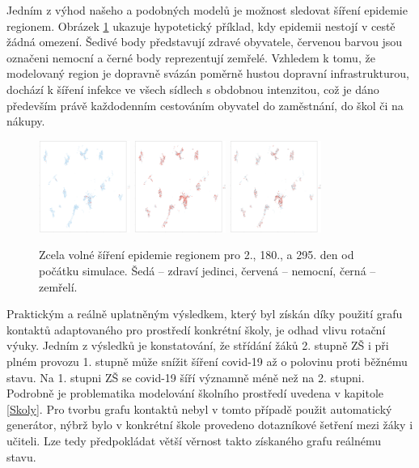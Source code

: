 Jedním z výhod našeho a podobných modelů je možnost sledovat šíření epidemie regionem. Obrázek \ref{sireniepidemie} ukazuje hypotetický příklad, kdy epidemii nestojí v cestě žádná omezení. Šedivé body představují zdravé obyvatele, červenou barvou jsou označeni nemocní a černé body reprezentují zemřelé. Vzhledem k tomu, že modelovaný region je dopravně svázán poměrně hustou dopravní infrastrukturou, dochází k šíření infekce ve všech sídlech s obdobnou intenzitou, což je dáno především právě každodenním cestováním obyvatel do zaměstnání, do škol či na nákupy.

\begin{figure}
\begin{center}
\includegraphics[width=30mm]{pic/hodo002.png}
\includegraphics[width=30mm]{pic/hodo180.png}
\includegraphics[width=30mm]{pic/hodo295.png}
\end{center}
\caption{Zcela volné šíření epidemie regionem pro 2., 180., a 295. den od počátku simulace. Šedá -- zdraví jedinci, červená -- nemocní, černá -- zemřelí. }
\label{sireniepidemie}
\end{figure}

Praktickým a reálně uplatněným výsledkem, který byl získán díky použití grafu kontaktů adaptovaného pro prostředí konkrétní školy, je odhad vlivu rotační výuky. Jedním z výsledků je konstatování, že střídání žáků 2. stupně ZŠ i při plném provozu 1. stupně může snížit šíření covid-19 až o polovinu proti běžnému stavu. Na 1. stupni ZŠ se covid-19 šíří významně méně než na 2. stupni. Podrobně je problematika modelování školního prostředí uvedena v kapitole \ref{Skoly}. Pro tvorbu grafu kontaktů nebyl v tomto případě použit automatický generátor, nýbrž bylo v konkrétní škole provedeno dotazníkové šetření mezi žáky i učiteli. Lze tedy předpokládat větší věrnost takto získaného grafu reálnému stavu.


